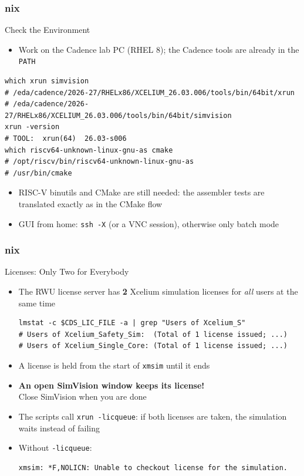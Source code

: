 \documentclass{beamer}
\newcommand{\astitle}{nix}
\newcommand{\assubtitle}{nix}
\newcommand{\cmd}[1]{\texttt{#1}}
\begin{document}
\renewcommand{\assubtitle}{Check the Environment}
\begin{frame}[fragile]
\frametitle{\astitle}
\begin{block}{\assubtitle}
  \begin{itemize}
    \item Work on the Cadence lab PC (RHEL 8); the Cadence tools are
      already in the \cmd{PATH}
  \end{itemize}
\begin{lstlisting}[style=sh]
which xrun simvision
# /eda/cadence/2026-27/RHELx86/XCELIUM_26.03.006/tools/bin/64bit/xrun
# /eda/cadence/2026-27/RHELx86/XCELIUM_26.03.006/tools/bin/64bit/simvision
xrun -version
# TOOL:  xrun(64)  26.03-s006
which riscv64-unknown-linux-gnu-as cmake
# /opt/riscv/bin/riscv64-unknown-linux-gnu-as
# /usr/bin/cmake
\end{lstlisting}
  \begin{itemize}
    \item RISC-V binutils and CMake are still needed: the assembler tests are
      translated exactly as in the CMake flow
    \item GUI from home: \cmd{ssh -X} (or a VNC session), otherwise only batch mode
  \end{itemize}
\end{block}
\end{frame}

\renewcommand{\assubtitle}{Licenses: Only Two for Everybody}
\begin{frame}[fragile]
\frametitle{\astitle}
\begin{block}{\assubtitle}
  \begin{itemize}
    \item The RWU license server has \textbf{2} Xcelium simulation licenses
      for \emph{all} users at the same time
\begin{lstlisting}[style=sh]
lmstat -c $CDS_LIC_FILE -a | grep "Users of Xcelium_S"
# Users of Xcelium_Safety_Sim:  (Total of 1 license issued; ...)
# Users of Xcelium_Single_Core: (Total of 1 license issued; ...)
\end{lstlisting}
    \item A license is held from the start of \cmd{xmsim} until it ends
    \item \textbf{An open SimVision window keeps its license!}\\
      Close SimVision when you are done
    \item The scripts call \cmd{xrun -licqueue}: if both licenses are taken,
      the simulation waits instead of failing
    \item Without \cmd{-licqueue}:
\begin{lstlisting}
xmsim: *F,NOLICN: Unable to checkout license for the simulation.
\end{lstlisting}
  \end{itemize}
\end{block}
\end{frame}
\end{document}
